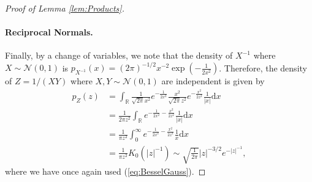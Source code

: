 \documentclass{article}
\newtheorem{lemma}[theorem]{Lemma}
\theoremstyle{definition}
\newcommand{\dd}{\mathrm{d}}
\begin{document}
\begin{proof}[Proof of Lemma \ref{lem:Products}]
\paragraph{Reciprocal Normals.} Finally, by a change of variables, we note that the density of $X^{-1}$ where $X \sim \mathcal{N}(0,1)$ is $p_{X^{-1}}(x) = (2\pi)^{-1/2} x^{-2}\exp(-\frac{1}{2x^2})$. Therefore, the density of $Z = 1/(XY)$ where $X,Y \sim \mathcal{N}(0,1)$ are independent is given by
\begin{align*}
p_{Z}(z)&=\int_{\mathbb{R}}\frac{1}{\sqrt{2\pi}x^{2}}e^{-\frac{1}{2x^{2}}}\frac{x^{2}}{\sqrt{2\pi}z^{2}}e^{-\frac{x^{2}}{2z^{2}}}\frac{1}{\left|x\right|}\dd x\\
&=\frac{1}{2\pi z^{2}}\int_{\mathbb{R}}e^{-\frac{1}{2x^{2}}-\frac{x^{2}}{2z^{2}}}\frac{1}{\left|x\right|}\dd x\\
&=\frac{1}{\pi z^{2}}\int_{0}^{\infty}e^{-\frac{1}{2x^{2}}-\frac{x^{2}}{2z^{2}}}\frac{1}{x}\dd x\\
&=\frac{1}{\pi z^{2}}K_{0}(|z|^{-1}) \sim \sqrt{\frac{1}{2\pi}}|z|^{-3/2}e^{-|z|^{-1}},
\end{align*}
where we have once again used (\ref{eq:BesselGauss}). 
\end{proof}

\end{document}
